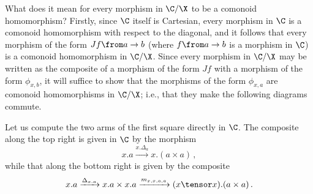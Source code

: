 What does it mean for every morphism in $\C/\X$ to be a comonoid homomorphism?  
Firstly, since $\C$ itself is Cartesian, every morphism in $\C$ is a comonoid homomorphism with respect to the diagonal, and it follows that every morphism of the form $Jf \from a \to b$ (where $f\from a \to b$ is a morphism in $\C$) is a comonoid homomorphism in $\C/\X$.  
Since every morphism in $\C/\X$ may be written as the composite of a morphism of the form $Jf$ with a morphism of the form $\phi_{x,b}$, it will suffice to show that the morphisms of the form $\phi_{x,a}$ are comonoid homomorphisms in $\C/\X$; i.e., that they make the following diagrams commute.
Let us compute the two arms of the first square directly in $\C$.  
The composite along the top right is given in $\C$ by the morphism
\[
  x.a \xrightarrow{x.\Delta_a}
  x.(a\times a)\,,
  \]
while that along the bottom right is given by the composite
\[
  x.a \xrightarrow{\Delta_{x.a}}
  x.a \times x.a \xrightarrow{m_{x,x,a,a}}
  (x\tensor x) . (a \times a)\,.
  \]

